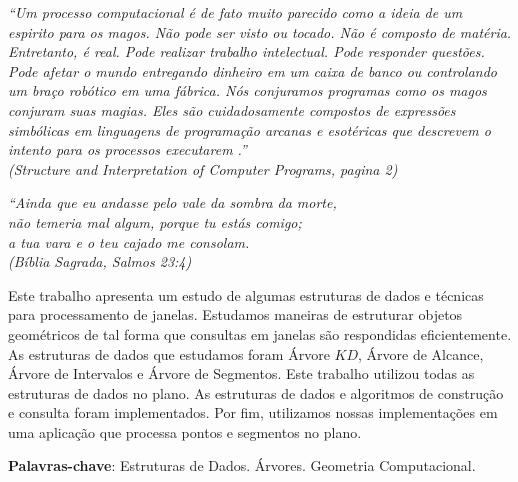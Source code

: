 \begin{epigrafe}
    \vspace*{\fill}
    \begin{flushright}
		\textit{``Um processo computacional é de fato muito parecido como a ideia de um espirito para os magos. Não pode ser visto ou tocado. Não é composto de matéria. Entretanto, é real. Pode realizar trabalho intelectual. Pode responder questões. Pode afetar o mundo entregando dinheiro em um caixa de banco ou controlando um braço robótico em uma fábrica. Nós conjuramos programas como os magos conjuram suas magias. Eles são cuidadosamente compostos de expressões simbólicas em linguagens de programação arcanas e esotéricas que descrevem o intento para os processos executarem .'' \\
		(Structure and Interpretation of Computer Programs, pagina 2)}
	\end{flushright}
	\begin{flushright}
		\textit{``Ainda que eu andasse pelo vale da sombra da morte, \\
		não temeria mal algum, porque tu estás comigo;\\
		a tua vara e o teu cajado me consolam.\\
		(Bíblia Sagrada, Salmos 23:4)}
	\end{flushright}
\end{epigrafe}

%

\setlength{\absparsep}{18pt} %
\begin{resumo}
	\SingleSpacing
	Este trabalho apresenta um estudo de algumas estruturas de dados e técnicas para processamento de janelas. Estudamos maneiras de estruturar objetos geométricos de tal forma que consultas em janelas são respondidas eficientemente. As estruturas de dados que estudamos foram Árvore $KD$, Árvore de Alcance, Árvore de Intervalos e Árvore de Segmentos. Este trabalho utilizou todas as estruturas de dados no plano. As estruturas de dados e algoritmos de construção e consulta foram implementados. Por fim, utilizamos nossas implementações em uma aplicação que processa pontos e segmentos no plano. 

	\textbf{Palavras-chave}: Estruturas de Dados. Árvores. Geometria Computacional.
\end{resumo}

